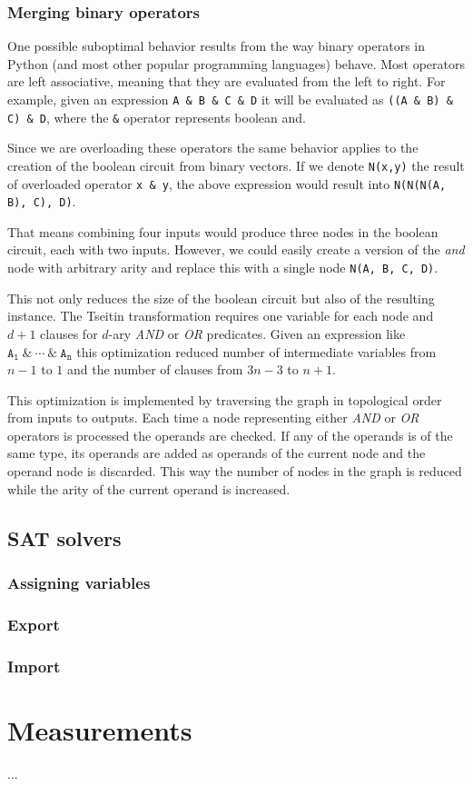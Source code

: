 \subsection{Merging binary operators}

One possible suboptimal behavior results from the way binary operators in Python (and most other popular programming languages) behave.
Most operators are left associative, meaning that they are evaluated from the left to right.
For example, given an expression \texttt{A \& B \& C \& D} it will be evaluated as \texttt{((A \& B) \& C) \& D}, where the \texttt{\&} operator represents boolean and.

Since we are overloading these operators the same behavior applies to the creation of the boolean circuit from binary vectors.
If we denote \texttt{N(x,y)} the result of overloaded operator \texttt{x \& y}, the above expression would result into \texttt{N(N(N(A, B), C), D)}.

That means combining four inputs would produce three nodes in the boolean circuit, each with two inputs.
However, we could easily create a version of the \emph{and} node with arbitrary arity and replace this with a single node \texttt{N(A, B, C, D)}.

This not only reduces the size of the boolean circuit but also of the resulting instance. 
The Tseitin transformation requires one variable for each node and $d+1$ clauses for $d$-ary \emph{AND} or \emph{OR} predicates.
Given an expression like $\texttt{A}_\texttt{1} ~\&~ \cdots ~\&~ \texttt{A}_\texttt{n}$ this optimization reduced number of intermediate variables from $n-1$ to $1$ and the number of clauses from $3n-3$ to $n+1$.

This optimization is implemented by traversing the graph in topological order from inputs to outputs.
Each time a node representing either \emph{AND} or \emph{OR} operators is processed the operands are checked.
If any of the operands is of the same type, its operands are added as operands of the current node and the operand node is discarded.
This way the number of nodes in the graph is reduced while the arity of the current operand is increased.


\section{SAT solvers}
\subsection{Assigning variables}
\subsection{Export}
\subsection{Import}

\chapter{Measurements}

...\\

